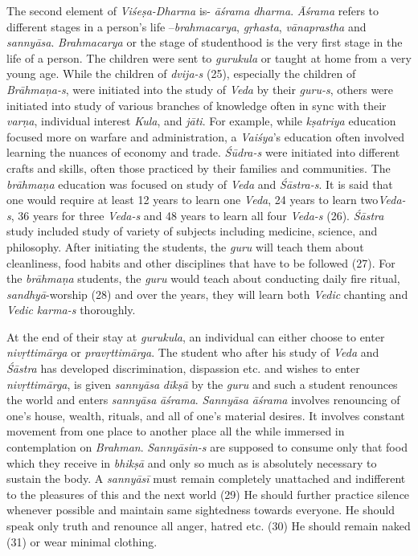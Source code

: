 The second element of \emph{Viśeṣa-Dharma} is- \emph{āśrama} \emph{dharma}. \emph{Āśrama} refers to different stages in a person's life --\emph{brahmacarya}, \emph{gṛhasta}, \emph{vānaprastha} and \emph{sannyāsa}. \emph{Brahmacarya} or the stage of studenthood is the very first stage in the life of a person. The children were sent to \emph{gurukula} or taught at home from a very young age. While the children of \emph{dvija-s} (25), especially the children of \emph{Brāhmaṇa-s}, were initiated into the study of \emph{Veda} by their \emph{guru-s}, others were initiated into study of various branches of knowledge often in sync with their \emph{varṇa}, individual interest \emph{Kula}, and \emph{jāti}. For example, while \emph{kṣatriya} education focused more on warfare and administration, a \emph{Vaiśya}'s education often involved learning the nuances of economy and trade. \emph{Śūdra-s} were initiated into different crafts and skills, often those practiced by their families and communities. The \emph{brāhmaṇa} education was focused on study of \emph{Veda} and \emph{Śāstra-s}. It is said that one would require at least 12 years to learn one \emph{Veda}, 24 years to learn two\emph{Veda-s}, 36 years for three \emph{Veda-s} and 48 years to learn all four \emph{Veda-s} (26). \emph{Śāstra} study included study of variety of subjects including medicine, science, and philosophy. After initiating the students, the \emph{guru} will teach them about cleanliness, food habits and other disciplines that have to be followed (27). For the \emph{brāhmaṇa} students, the \emph{guru} would teach about conducting daily fire ritual, \emph{sandhyā}-worship (28) and over the years, they will learn both \emph{Vedic} chanting and \emph{Vedic} \emph{karma-s} thoroughly.

At the end of their stay at \emph{gurukula}, an individual can either choose to enter \emph{nivṛttimārga} or \emph{pravṛttimārga}. The student who after his study of \emph{Veda} and \emph{Śāstra} has developed discrimination, dispassion etc. and wishes to enter \emph{nivṛttimārga}, is given \emph{sannyāsa} \emph{dīkṣā} by the \emph{guru} and such a student renounces the world and enters \emph{sannyāsa} \emph{āśrama}. \emph{Sannyāsa} \emph{āśrama} involves renouncing of one's house, wealth, rituals, and all of one's material desires. It involves constant movement from one place to another place all the while immersed in contemplation on \emph{Brahman}. \emph{Sannyāsin-s} are supposed to consume only that food which they receive in \emph{bhikṣā} and only so much as is absolutely necessary to sustain the body. A \emph{sannyāsī} must remain completely unattached and indifferent to the pleasures of this and the next world (29) He should further practice silence whenever possible and maintain same sightedness towards everyone. He should speak only truth and renounce all anger, hatred etc. (30) He should remain naked (31) or wear minimal clothing.

